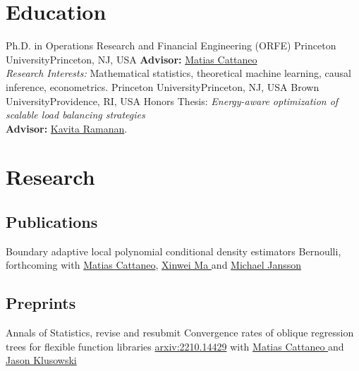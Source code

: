 \documentclass[10pt,a4paper,roman]{moderncv}        %
\begin{document}
\makecvtitle

\vspace{-0.7cm}
\section{Education}
{Ph.D. in Operations Research and Financial Engineering (ORFE)}
{Princeton University}{Princeton, NJ, USA}{}
{\textbf{Advisor: }\color{blue}\href{https://cattaneo.princeton.edu}{Matias Cattaneo}\color{black}\\
\textit{Research Interests:} Mathematical statistics, theoretical machine
learning, causal inference, econometrics.}
{Princeton University}{Princeton, NJ, USA}{}{}
{Brown University}{Providence, RI, USA}{}{ Honors Thesis: \textit{Energy-aware optimization of scalable load balancing
    strategies}
  \\
  \textbf{Advisor: }
  \color{blue}\href{https://www.brown.edu/academics/applied-mathematics/faculty/kavita-ramanan/home}
  {Kavita Ramanan}\color{black}.}  %
{}

\vspace{-0.3cm}
\section{Research}
\subsection{Publications}
{\vspace{-0.4cm}}
{Boundary adaptive local polynomial conditional density estimators}
{Bernoulli, forthcoming}{}
{with \color{blue}\href{https://cattaneo.princeton.edu}{Matias Cattaneo}\color{black},
  \color{blue}\href{https://sites.google.com/view/xinweima/home?authuser=0}{Xinwei
    Ma }\color{black}
  and
  \color{blue}\href{https://sites.google.com/berkeley.edu/michael-jansson/}{Michael
    Jansson}\color{black}
  \quad
}

\subsection{Preprints}
\cventry{}
{Annals of Statistics, revise and resubmit}
{Convergence rates of oblique regression trees for flexible function libraries}
{\color{blue} \href{https://arxiv.org/abs/2210.14429}{arxiv:2210.14429} \color{black}}
{}
{with
  \color{blue}\href{https://cattaneo.princeton.edu}{Matias Cattaneo }\color{black} and
  \color{blue}\href{https://klusowski.princeton.edu}{Jason Klusowski}}
\end{document}
